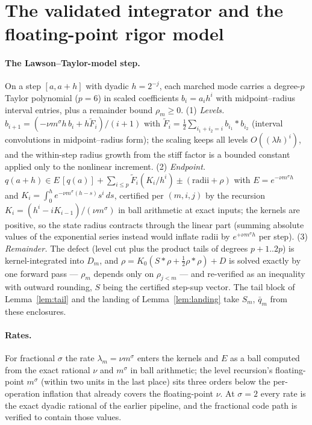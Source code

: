 \documentclass[11pt,a4paper]{article}
\theoremstyle{plain}
\theoremstyle{definition}
\begin{document}
\section{The validated integrator and the floating-point rigor model}\label{app:C}

\paragraph{The Lawson--Taylor-model step.} On a step $[a,a+h]$ with dyadic $h=2^{-j}$, each marched mode carries a degree-$p$ Taylor polynomial ($p=6$) in scaled coefficients $b_i=a_ih^i$ with midpoint--radius interval entries, plus a remainder bound $\rho_m\ge0$. (1) \emph{Levels.} $b_{i+1}=(-\nu m^\sigma h\,b_i+h\tilde F_i)/(i+1)$ with $\tilde F_i=\tfrac12\sum_{i_1+i_2=i}b_{i_1}*b_{i_2}$ (interval convolutions in midpoint--radius form); the scaling keeps all levels $O((\lambda h)^i)$, and the within-step radius growth from the stiff factor is a bounded constant applied only to the nonlinear increment. (2) \emph{Endpoint.} $q(a+h)\in E\,[q(a)]+\sum_{i\le p}\tilde F_i(K_i/h^i)\pm(\text{radii}+\rho)$ with $E=e^{-\nu m^\sigma h}$ and $K_i=\int_0^he^{-\nu m^\sigma(h-s)}s^i\,ds$, certified per $(m,i,j)$ by the recursion $K_i=(h^i-iK_{i-1})/(\nu m^\sigma)$ in ball arithmetic at exact inputs; the kernels are positive, so the state radius contracts through the linear part (summing absolute values of the exponential series instead would inflate radii by $e^{+\nu m^\sigma h}$ per step). (3) \emph{Remainder.} The defect (level cut plus the product tails of degrees $p+1..2p$) is kernel-integrated into $D_m$, and $\rho=K_0(S*\rho+\tfrac12\rho*\rho)+D$ is solved exactly by one forward pass --- $\rho_m$ depends only on $\rho_{j<m}$ --- and re-verified as an inequality with outward rounding, $S$ being the certified step-sup vector. The tail block of Lemma~\ref{lem:tail} and the landing of Lemma~\ref{lem:landing} take $S_m$, $\bar q_m$ from these enclosures.

\paragraph{Rates.} For fractional $\sigma$ the rate $\lambda_m=\nu m^\sigma$ enters the kernels and $E$ as a ball computed from the exact rational $\nu$ and $m^\sigma$ in ball arithmetic; the level recursion's floating-point $m^\sigma$ (within two units in the last place) sits three orders below the per-operation inflation that already covers the floating-point $\nu$. At $\sigma=2$ every rate is the exact dyadic rational of the earlier pipeline, and the fractional code path is verified to contain those values.
\end{document}
